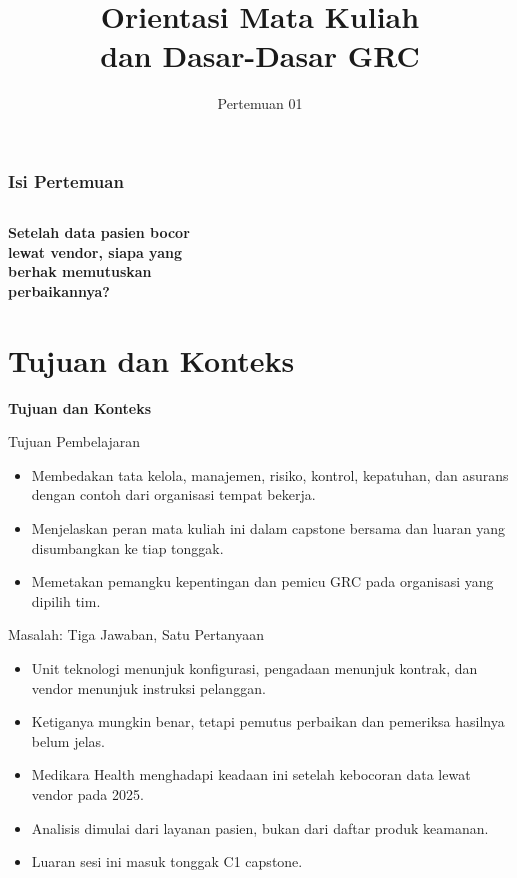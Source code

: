 \documentclass[aspectratio=169, table, 12pt]{beamer}
\title{\Huge Orientasi Mata Kuliah\\ \vspace{10pt} dan Dasar-Dasar GRC}
\date{Pertemuan 01}
\begin{document}
\frame{\titlepage}

\begin{frame}
  \frametitle{Isi Pertemuan}
  \vspace{14pt}
  \begin{columns}[t]
    {\small\tableofcontents[sections={1-3}]}

    {\small\tableofcontents[sections={4-6}]}
  \end{columns}
\end{frame}

\begin{frame}{\hfill}
  \centering
  \Huge{\textbf{Setelah data pasien bocor\\lewat vendor, siapa yang\\berhak memutuskan\\perbaikannya?}}
\end{frame}

\section{Tujuan dan Konteks}

\begin{frame}{\hfill}
  \centering
  \Huge{\textbf{Tujuan dan Konteks}}
\end{frame}

\begin{frame}{{\Large Tujuan Pembelajaran}}
  \vspace{10pt}
  \begin{itemize}
    \item Membedakan tata kelola, manajemen, risiko, kontrol, kepatuhan, dan asurans
          dengan contoh dari organisasi tempat bekerja.
    \item Menjelaskan peran mata kuliah ini dalam capstone bersama dan luaran yang
          disumbangkan ke tiap tonggak.
    \item Memetakan pemangku kepentingan dan pemicu GRC pada organisasi yang dipilih tim.
  \end{itemize}
\end{frame}

\begin{frame}{{\Large Masalah: Tiga Jawaban, Satu Pertanyaan}}
  \vspace{6pt}
  \small
  \begin{itemize}
    \item Unit teknologi menunjuk konfigurasi, pengadaan menunjuk kontrak, dan vendor menunjuk
          instruksi pelanggan.
    \item Ketiganya mungkin benar, tetapi pemutus perbaikan dan pemeriksa hasilnya belum jelas.
    \item Medikara Health menghadapi keadaan ini setelah kebocoran data lewat vendor pada 2025.
    \item Analisis dimulai dari layanan pasien, bukan dari daftar produk keamanan.
    \item Luaran sesi ini masuk tonggak C1 capstone.
  \end{itemize}
\end{frame}
\end{document}
